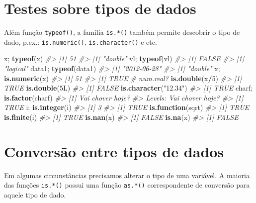\documentclass[]{book}
\newenvironment{Shaded}{\begin{snugshade}}{\end{snugshade}}
\newcommand{\KeywordTok}[1]{\textcolor[rgb]{0.13,0.29,0.53}{\textbf{#1}}}
\newcommand{\DecValTok}[1]{\textcolor[rgb]{0.00,0.00,0.81}{#1}}
\newcommand{\StringTok}[1]{\textcolor[rgb]{0.31,0.60,0.02}{#1}}
\newcommand{\CommentTok}[1]{\textcolor[rgb]{0.56,0.35,0.01}{\textit{#1}}}
\newcommand{\OperatorTok}[1]{\textcolor[rgb]{0.81,0.36,0.00}{\textbf{#1}}}
\newcommand{\NormalTok}[1]{#1}
\begin{document}
\section{Testes sobre tipos de dados}\label{testes-sobre-tipos-de-dados}

Além função \texttt{typeof()}, a família \texttt{is.*()} também permite
descobrir o tipo de dado, p.ex.: \texttt{is.numeric()},
\texttt{is.character()} e etc.

\begin{Shaded}
\begin{Highlighting}[]
\NormalTok{x; }\KeywordTok{typeof}\NormalTok{(x)}
\CommentTok{#> [1] 51}
\CommentTok{#> [1] "double"}
\NormalTok{vl; }\KeywordTok{typeof}\NormalTok{(vl)}
\CommentTok{#> [1] FALSE}
\CommentTok{#> [1] "logical"}
\NormalTok{data1; }\KeywordTok{typeof}\NormalTok{(data1)}
\CommentTok{#> [1] "2012-06-28"}
\CommentTok{#> [1] "double"}
\NormalTok{x; }\KeywordTok{is.numeric}\NormalTok{(x)}
\CommentTok{#> [1] 51}
\CommentTok{#> [1] TRUE}
\CommentTok{#  num.real?}
\KeywordTok{is.double}\NormalTok{(x}\OperatorTok{/}\DecValTok{5}\NormalTok{)}
\CommentTok{#> [1] TRUE}
\KeywordTok{is.double}\NormalTok{(5L)}
\CommentTok{#> [1] FALSE}
\KeywordTok{is.character}\NormalTok{(}\StringTok{"12.34"}\NormalTok{)}
\CommentTok{#> [1] TRUE}
\NormalTok{charf; }\KeywordTok{is.factor}\NormalTok{(charf)}
\CommentTok{#> [1] Vai chover hoje?}
\CommentTok{#> Levels: Vai chover hoje?}
\CommentTok{#> [1] TRUE}
\NormalTok{i; }\KeywordTok{is.integer}\NormalTok{(i)}
\CommentTok{#> [1] 3}
\CommentTok{#> [1] TRUE}
\KeywordTok{is.function}\NormalTok{(sqrt)}
\CommentTok{#> [1] TRUE}
\KeywordTok{is.finite}\NormalTok{(i)}
\CommentTok{#> [1] TRUE}
\KeywordTok{is.nan}\NormalTok{(x)}
\CommentTok{#> [1] FALSE}
\KeywordTok{is.na}\NormalTok{(x)}
\CommentTok{#> [1] FALSE}
\end{Highlighting}
\end{Shaded}

\section{Conversão entre tipos de
dados}\label{conversao-entre-tipos-de-dados}

Em algumas circunstâncias precisamos alterar o tipo de uma variável. A
maioria das funções \texttt{is.*()} possui uma função \texttt{as.*()}
correspondente de conversão para aquele tipo de dado.
\end{document}
